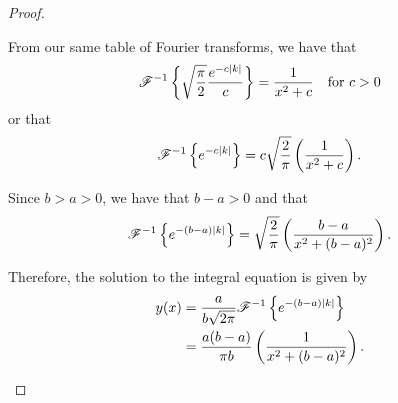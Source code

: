 \begin{proof}
\begin{enumerate}
      From our same table of Fourier transforms, we have that
      \begin{align*}
        \mathscr{F}^{-1}\left\{ {\sqrt{\frac{\pi}{2}}\frac{e^{-c|k|}}{c}} \right\} = \frac{1}{x^2 + c} \quad \text{for $c > 0$}
      \end{align*}
      or that
      \begin{align*}
        \mathscr{F}^{-1}\left\{ {e^{-c|k|}} \right\} = c\sqrt{\frac{2}{\pi}}\left(\frac{1}{x^2 + c}\right).
      \end{align*}

      Since $b > a > 0$, we have that $b-a > 0$ and that
      \begin{align*}
        \mathscr{F}^{-1}\left\{ {e^{-(b-a)|k|}} \right\} = \sqrt{\frac{2}{\pi}}\left(\frac{b-a}{x^2 + (b-a)^2}\right).
      \end{align*}

      Therefore, the solution to the integral equation is given by
      \begin{align*}
        y(x) &= \frac{a}{b\sqrt{2\pi}} \mathscr{F}^{-1}\left\{ {e^{-(b-a)|k|}} \right\} \\
        &= \frac{a(b-a)}{\pi b}\left(\frac{1}{x^2 + (b-a)^2}\right).
      \end{align*}

  \end{enumerate}

\end{proof}
\newpage
